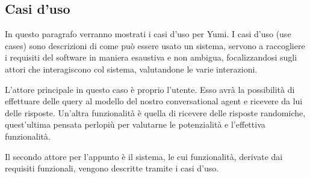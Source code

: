 \subsection{Casi d'uso}
In questo paragrafo verranno mostrati i casi d'uso per Yumi. I casi d’uso (use cases) sono descrizioni di come può essere usato un sistema, servono a raccogliere i requisiti del software in maniera esaustiva e non ambigua, focalizzandosi sugli attori che interagiscono col sistema, valutandone le varie interazioni. 

L'attore principale in questo caso è proprio l'utente. Esso avrà la possibilità di effettuare delle query al modello del nostro conversational agent e ricevere da lui delle risposte. Un'altra funzionalità è quella di ricevere delle risposte randomiche, quest'ultima pensata perlopiù per valutarne le potenzialità e l'effettiva funzionalità.

Il secondo attore per l'appunto è il sistema, le cui funzionalità, derivate dai requisiti funzionali, vengono descritte tramite i casi d'uso.

